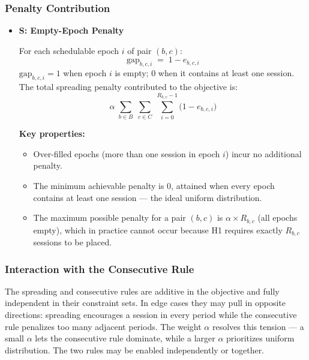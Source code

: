\documentclass{article}
\begin{document}
\subsubsection*{Penalty Contribution}
\begin{itemize}
    \item \textbf{S: Empty-Epoch Penalty}

    For each schedulable epoch $i$ of pair $(b,c)$:
    \begin{equation}
        \text{gap}_{b,c,i} \;=\; 1 - e_{b,c,i}
    \end{equation}
    $\text{gap}_{b,c,i} = 1$ when epoch $i$ is empty; $0$ when it contains at least one session.
    The total spreading penalty contributed to the objective is:
    \begin{equation}
        \alpha \;\sum_{b \in B}\;\sum_{c \in C}\;\sum_{i=0}^{R_{b,c}-1}
        \bigl(1 - e_{b,c,i}\bigr)
    \end{equation}

    \noindent\textbf{Key properties:}
    \begin{itemize}
        \item Over-filled epochs (more than one session in epoch $i$) incur no additional penalty.
        \item The minimum achievable penalty is 0, attained when every epoch contains
              at least one session — the ideal uniform distribution.
        \item The maximum possible penalty for a pair $(b,c)$ is $\alpha \times R_{b,c}$
              (all epochs empty), which in practice cannot occur because H1 requires
              exactly $R_{b,c}$ sessions to be placed.
    \end{itemize}
\end{itemize}

\subsubsection*{Interaction with the Consecutive Rule}
The spreading and consecutive rules are additive in the objective and fully independent
in their constraint sets. In edge cases they may pull in opposite directions: spreading
encourages a session in every period while the consecutive rule penalizes too many
adjacent periods. The weight $\alpha$ resolves this tension — a small $\alpha$ lets
the consecutive rule dominate, while a larger $\alpha$ prioritizes uniform distribution.
The two rules may be enabled independently or together.
\end{document}
